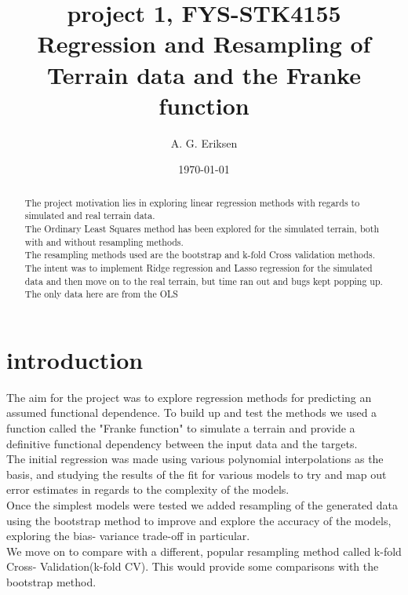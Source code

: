 \documentclass[12pt]{revtex4-2}
\begin{document}
\title{%
	project 1, FYS-STK4155 \\
	\large Regression and Resampling of Terrain data and the Franke function}
\author{A. G. Eriksen}
\date{\today}
\begin{abstract}
	The project motivation lies in exploring linear regression methods with regards 
	to simulated and real terrain data. \\
	The Ordinary Least Squares method has been explored for the simulated terrain, 
	both with and without resampling methods. \\
	The resampling methods used are the bootstrap and k-fold Cross validation 
	methods. \\
	The intent was to implement Ridge regression and Lasso regression for 
	the simulated data and then move on to the real terrain, but time ran out and 
	bugs kept popping up. The only data here are from the OLS
\end{abstract}
\maketitle
\tableofcontents

\section{introduction}

The aim for the project was to explore regression methods for predicting an assumed 
functional dependence. To build up and test the methods we used a function called the
"Franke function"\cite{franke1979critical} to simulate a terrain and provide a definitive
functional dependency between the input data and the targets. \\

The initial regression was made using various polynomial interpolations as the basis, 
and studying the results of the fit for various models to try and map out error 
estimates in regards to the complexity of the models. \\

Once the simplest models were tested we added resampling of the generated data using the 
bootstrap method to improve and explore the accuracy of the models, exploring the bias-
variance trade-off in particular. \\

We move on to compare with a different, popular resampling method called k-fold Cross-
Validation(k-fold CV). This would provide some comparisons with the bootstrap method.
\end{document}
